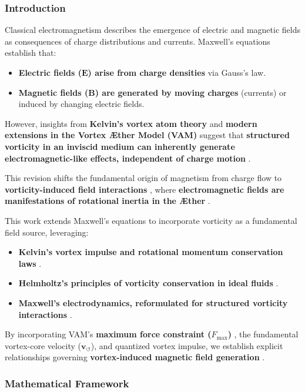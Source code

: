 \documentclass[a4paper,10pt]{article}
\begin{document}
\subsubsection*{Introduction}
Classical electromagnetism describes the emergence of electric and magnetic fields as consequences of charge distributions and currents. Maxwell's equations establish that:
\begin{itemize}
    \item \textbf{Electric fields (\(\mathbf{E}\)) arise from charge densities}  via Gauss's law.
    \item \textbf{Magnetic fields (\(\mathbf{B}\)) are generated by moving charges}  (currents) or induced by changing electric fields.
\end{itemize}
However, insights from \textbf{Kelvin's vortex atom theory}  and \textbf{modern extensions in the Vortex Æther Model (VAM)}  suggest that \textbf{structured vorticity in an inviscid medium can inherently generate electromagnetic-like effects, independent of charge motion} .

This revision shifts the fundamental origin of magnetism from charge flow to \textbf{vorticity-induced field interactions} , where \textbf{electromagnetic fields are manifestations of rotational inertia in the Æther} .

This work extends Maxwell's equations to incorporate vorticity as a fundamental field source, leveraging:
\begin{itemize}
    \item \textbf{Kelvin's vortex impulse and rotational momentum conservation laws}  \cite{kelvin1867}.
    \item \textbf{Helmholtz's principles of vorticity conservation in ideal fluids}  \cite{helmholtz1858}.
    \item \textbf{Maxwell's electrodynamics, reformulated for structured vorticity interactions}  \cite{maxwell1861}.
\end{itemize}
By incorporating VAM's \textbf{maximum force constraint (\( F_{\max} \))} , the fundamental vortex-core velocity (\( \mathbf{v}_{\scriptscriptstyle\boldsymbol{\circlearrowleft}} \)), and quantized vortex impulse, we establish explicit relationships governing \textbf{vortex-induced magnetic field generation} .

\subsubsection*{Mathematical Framework}
\end{document}
